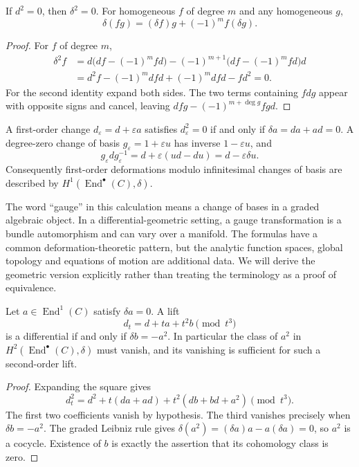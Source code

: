 \begin{proposition}
If $d^2=0$, then $\delta^2=0$. For homogeneous $f$ of degree $m$ and any homogeneous $g$,
\[
\delta(fg)=(\delta f)g+(-1)^m f(\delta g).
\]
\end{proposition}
\begin{proof}
For $f$ of degree $m$,
\begin{align*}
\delta^2f
&=d\bigl(df-(-1)^mfd\bigr)
 -(-1)^{m+1}\bigl(df-(-1)^mfd\bigr)d\\
&=d^2f-(-1)^mdfd+(-1)^mdfd-fd^2=0.
\end{align*}
For the second identity expand both sides. The two terms containing $fdg$ appear with opposite signs and cancel, leaving $dfg-(-1)^{m+\deg g}fgd$.
\end{proof}

A first-order change $d_\varepsilon=d+\varepsilon a$ satisfies $d_\varepsilon^2=0$ if and only if $\delta a=da+ad=0$. A degree-zero change of basis $g_\varepsilon=1+\varepsilon u$ has inverse $1-\varepsilon u$, and
\[
g_\varepsilon d g_\varepsilon^{-1}
=d+\varepsilon(ud-du)=d-\varepsilon\delta u.
\]
Consequently first-order deformations modulo infinitesimal changes of basis are described by $H^1(\operatorname{End}^\bullet(C),\delta)$.

The word ``gauge'' in this calculation means a change of bases in a graded algebraic object. In a differential-geometric setting, a gauge transformation is a bundle automorphism and can vary over a manifold. The formulas have a common deformation-theoretic pattern, but the analytic function spaces, global topology and equations of motion are additional data. We will derive the geometric version explicitly rather than treating the terminology as a proof of equivalence.

\begin{proposition}
Let $a\in\operatorname{End}^1(C)$ satisfy $\delta a=0$. A lift
\[
d_t=d+ta+t^2b\pmod{t^3}
\]
is a differential if and only if $\delta b=-a^2$. In particular the class of $a^2$ in $H^2(\operatorname{End}^\bullet(C),\delta)$ must vanish, and its vanishing is sufficient for such a second-order lift.
\end{proposition}
\begin{proof}
Expanding the square gives
\[
d_t^2=d^2+t(da+ad)+t^2(db+bd+a^2)\pmod{t^3}.
\]
The first two coefficients vanish by hypothesis. The third vanishes precisely when $\delta b=-a^2$. The graded Leibniz rule gives $\delta(a^2)=(\delta a)a-a(\delta a)=0$, so $a^2$ is a cocycle. Existence of $b$ is exactly the assertion that its cohomology class is zero.
\end{proof}


